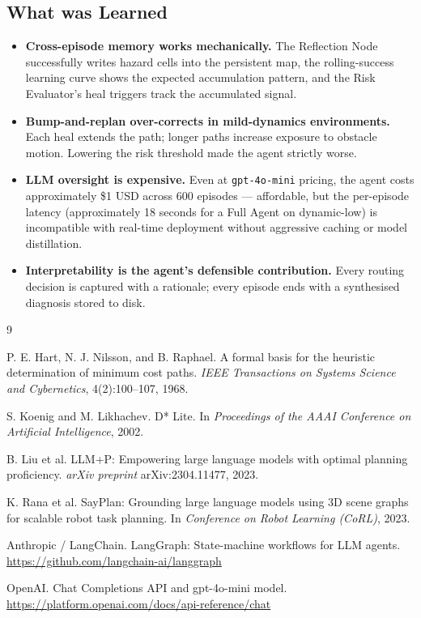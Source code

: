\documentclass[11pt, letterpaper]{article}
\begin{document}
\subsection{What was Learned}
\begin{itemize}
    \item \textbf{Cross-episode memory works mechanically.} The Reflection Node successfully writes hazard cells into the persistent map, the rolling-success learning curve shows the expected accumulation pattern, and the Risk Evaluator's heal triggers track the accumulated signal.
    \item \textbf{Bump-and-replan over-corrects in mild-dynamics environments.} Each heal extends the path; longer paths increase exposure to obstacle motion. Lowering the risk threshold made the agent strictly worse.
    \item \textbf{LLM oversight is expensive.} Even at \texttt{gpt-4o-mini} pricing, the agent costs approximately \$1 USD across 600 episodes --- affordable, but the per-episode latency (approximately 18 seconds for a Full Agent on dynamic-low) is incompatible with real-time deployment without aggressive caching or model distillation.
    \item \textbf{Interpretability is the agent's defensible contribution.} Every routing decision is captured with a rationale; every episode ends with a synthesised diagnosis stored to disk.
\end{itemize}


\begin{thebibliography}{9}

P. E. Hart, N. J. Nilsson, and B. Raphael.
\newblock A formal basis for the heuristic determination of minimum cost paths.
\newblock \textit{IEEE Transactions on Systems Science and Cybernetics}, 4(2):100--107, 1968.

S. Koenig and M. Likhachev.
\newblock D* Lite.
\newblock In \textit{Proceedings of the AAAI Conference on Artificial Intelligence}, 2002.

B. Liu et al.
\newblock LLM+P: Empowering large language models with optimal planning proficiency.
\newblock \textit{arXiv preprint} arXiv:2304.11477, 2023.

K. Rana et al.
\newblock SayPlan: Grounding large language models using 3D scene graphs for scalable robot task planning.
\newblock In \textit{Conference on Robot Learning (CoRL)}, 2023.

Anthropic / LangChain.
\newblock LangGraph: State-machine workflows for LLM agents.
\newblock \url{https://github.com/langchain-ai/langgraph}

OpenAI.
\newblock Chat Completions API and gpt-4o-mini model.
\newblock \url{https://platform.openai.com/docs/api-reference/chat}

\end{thebibliography}
\end{document}
